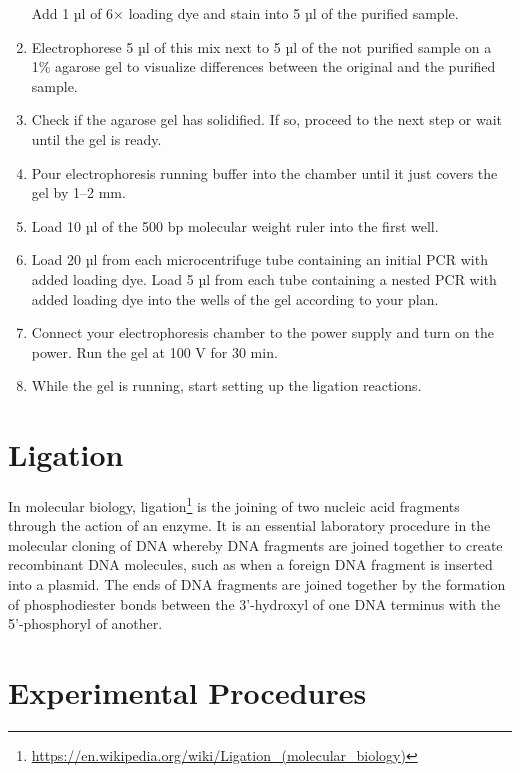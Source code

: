 \documentclass[]{book}
\let\rmarkdownfootnote\footnote%
\def\footnote{\protect\rmarkdownfootnote}
\renewcommand{\href}[2]{#2\footnote{\url{#1}}}
\theoremstyle{definition}
\theoremstyle{definition}
\theoremstyle{definition}
\theoremstyle{remark}
\begin{document}
\begin{enumerate}
  Add 1 µl of 6× loading dye and stain into 5 µl of the purified sample.
\item
  Electrophorese 5 µl of this mix next to 5 µl of the not purified
  sample on a 1\% agarose gel to visualize differences between the
  original and the purified sample.
\item
  Check if the agarose gel has solidified. If so, proceed to the next
  step or wait until the gel is ready.
\item
  Pour electrophoresis running buffer into the chamber until it just
  covers the gel by 1--2 mm.
\item
  Load 10 µl of the 500 bp molecular weight ruler into the first well.
\item
  Load 20 µl from each microcentrifuge tube containing an initial PCR
  with added loading dye. Load 5 µl from each tube containing a nested
  PCR with added loading dye into the wells of the gel according to your
  plan.
\item
  Connect your electrophoresis chamber to the power supply and turn on
  the power. Run the gel at 100 V for 30 min.
\item
  While the gel is running, start setting up the ligation reactions.
\end{enumerate}

\section{Ligation}\label{ligation}

In molecular biology,
\href{https://en.wikipedia.org/wiki/Ligation_(molecular_biology)}{ligation}
is the joining of two nucleic acid fragments through the action of an
enzyme. It is an essential laboratory procedure in the molecular cloning
of DNA whereby DNA fragments are joined together to create recombinant
DNA molecules, such as when a foreign DNA fragment is inserted into a
plasmid. The ends of DNA fragments are joined together by the formation
of phosphodiester bonds between the 3'-hydroxyl of one DNA terminus with
the 5'-phosphoryl of another.

\section{Experimental Procedures}\label{experimental-procedures-13}
\end{document}

